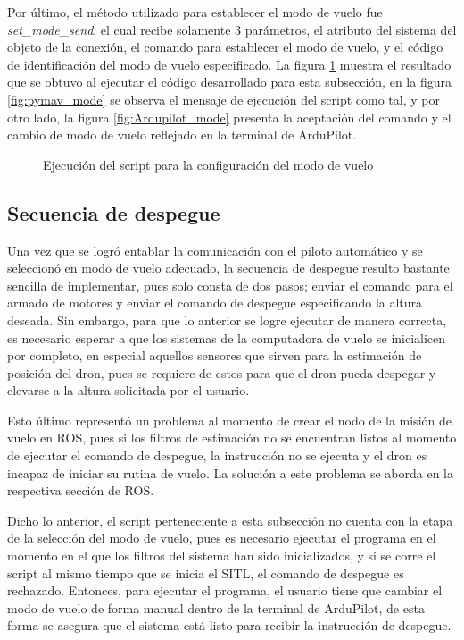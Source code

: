 Por último, el método utilizado para establecer el modo de vuelo fue \textit{set\_mode\_send}, el cual recibe solamente 3 parámetros, el atributo del sistema del objeto de la conexión, el comando para establecer el modo de vuelo, y el código de identificación del modo de vuelo especificado. La figura \ref{fig:pymav_modes} muestra el resultado que se obtuvo al ejecutar el código desarrollado para esta subsección, en la figura \ref{fig:pymav_mode} se observa el mensaje de ejecución del script como tal, y por otro lado, la figura \ref{fig:Ardupilot_mode} presenta la aceptación del comando y el cambio de modo de vuelo reflejado en la terminal de ArduPilot.


\begin{figure}[ht]
    \centering
    \hfill
    \caption{Ejecución del script para la configuración del modo de vuelo}
    \label{fig:pymav_modes}
\end{figure}


\subsection{Secuencia de despegue}

Una vez que se logró entablar la comunicación con el piloto automático y se seleccionó en modo de vuelo adecuado, la secuencia de despegue resulto bastante sencilla de implementar, pues solo consta de dos pasos; enviar el comando para el armado de motores y enviar el comando de despegue especificando la altura deseada. Sin embargo, para que lo anterior se logre ejecutar de manera correcta, es necesario esperar a que los sistemas de la computadora de vuelo se inicialicen por completo, en especial aquellos sensores que sirven para la estimación de posición del dron, pues se requiere de estos para que el dron pueda despegar y elevarse a la altura solicitada por el usuario.

Esto último representó un problema al momento de crear el nodo de la misión de vuelo en ROS, pues si los filtros de estimación no se encuentran listos al momento de ejecutar el comando de despegue, la instrucción no se ejecuta y el dron es incapaz de iniciar su rutina de vuelo. La solución a este problema se aborda en la respectiva sección de ROS.

Dicho lo anterior, el script perteneciente a esta subsección no cuenta con la etapa de la selección del modo de vuelo, pues es necesario ejecutar el programa en el momento en el que los filtros del sistema han sido inicializados, y si se corre el script al mismo tiempo que  se inicia el SITL, el comando de despegue es rechazado. Entonces, para ejecutar el programa, el usuario tiene que cambiar el modo de vuelo de forma manual dentro de la terminal de ArduPilot, de esta forma se asegura que el sistema está listo para recibir la instrucción de despegue.

